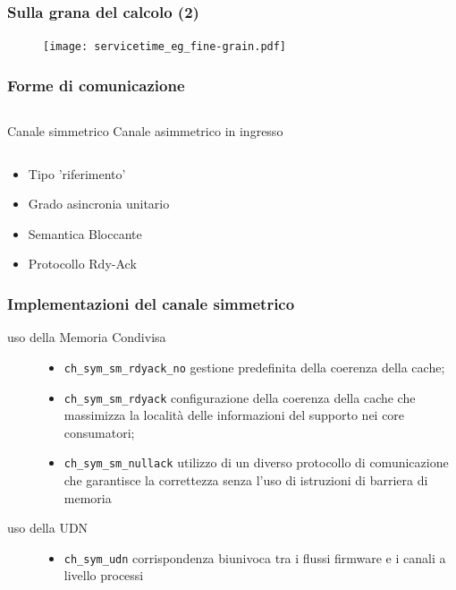 \documentclass{beamer}
\begin{document}
\begin{frame}
  \frametitle{Sulla grana del calcolo (2)}
  \begin{figure}
    \texttt{[image: servicetime\_eg\_fine-grain.pdf]}
  \end{figure}
\end{frame}

\begin{frame}
  \frametitle{Forme di comunicazione}
  \begin{columns}
    Canale simmetrico
    Canale asimmetrico in ingresso
  \end{columns}
  \begin{columns}
  \end{columns}
  \begin{itemize}
    \item Tipo 'riferimento'
    \item Grado asincronia unitario
    \item Semantica Bloccante
    \item Protocollo Rdy-Ack
  \end{itemize}
\end{frame}

\begin{frame}[fragile]
  \frametitle{Implementazioni del canale simmetrico}
  \begin{description}
  \item [uso della Memoria Condivisa] \hfill
    \begin{itemize}
    \item \verb+ch_sym_sm_rdyack_no+ gestione predefinita della coerenza della cache;
    \item \verb+ch_sym_sm_rdyack+ configurazione della coerenza della cache che massimizza la localit\`a delle informazioni del supporto nei core consumatori;
    \item \verb+ch_sym_sm_nullack+ utilizzo di un diverso protocollo di comunicazione che garantisce la correttezza senza l'uso di istruzioni di barriera di memoria
    \end{itemize}
  \item [uso della UDN] \hfill
    \begin{itemize}
    \item \verb+ch_sym_udn+ corrispondenza biunivoca tra i flussi firmware e i canali a livello processi
    \end{itemize}
  \end{description}
\end{frame}
\end{document}
